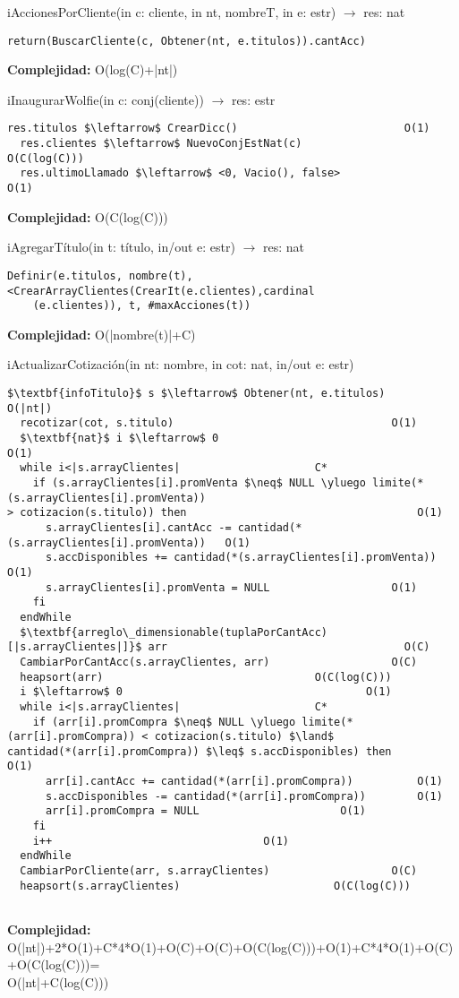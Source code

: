 iAccionesPorCliente(in c: cliente, in nt, nombreT, in e: estr) $\rightarrow$ res: nat
\begin{lstlisting}[mathescape]
  return(BuscarCliente(c, Obtener(nt, e.titulos)).cantAcc)
\end{lstlisting}
\textbf{Complejidad:} O(log(C)+|nt|)

iInaugurarWolfie(in c: conj(cliente)) $\rightarrow$ res: estr
\begin{lstlisting}[mathescape]
  res.titulos $\leftarrow$ CrearDicc()							O(1)
  res.clientes $\leftarrow$ NuevoConjEstNat(c)					O(C(log(C)))	
  res.ultimoLlamado $\leftarrow$ <0, Vacio(), false>					O(1)
\end{lstlisting}
\textbf{Complejidad:} O(C(log(C)))

iAgregarT\'itulo(in t: t\'itulo, in/out e: estr) $\rightarrow$ res: nat
\begin{lstlisting}[mathescape]
  Definir(e.titulos, nombre(t), <CrearArrayClientes(CrearIt(e.clientes),cardinal
  	(e.clientes)), t, #maxAcciones(t))
\end{lstlisting}
\textbf{Complejidad:} O(|nombre(t)|+C)

iActualizarCotizaci\'on(in nt: nombre, in cot: nat, in/out e: estr)
\begin{lstlisting}[mathescape]
  $\textbf{infoTitulo}$ s $\leftarrow$ Obtener(nt, e.titulos) 		O(|nt|)
  recotizar(cot, s.titulo)									O(1)
  $\textbf{nat}$ i $\leftarrow$ 0										O(1)
  while i<|s.arrayClientes|						C*
    if (s.arrayClientes[i].promVenta $\neq$ NULL \yluego limite(*(s.arrayClientes[i].promVenta))
> cotizacion(s.titulo)) then									O(1)
      s.arrayClientes[i].cantAcc -= cantidad(*(s.arrayClientes[i].promVenta))	O(1)
      s.accDisponibles += cantidad(*(s.arrayClientes[i].promVenta))		O(1)
      s.arrayClientes[i].promVenta = NULL					O(1)
    fi
  endWhile
  $\textbf{arreglo\_dimensionable(tuplaPorCantAcc)[|s.arrayClientes|]}$ arr										O(C)
  CambiarPorCantAcc(s.arrayClientes, arr)					O(C)
  heapsort(arr)								    O(C(log(C)))
  i $\leftarrow$ 0										O(1)
  while i<|s.arrayClientes|						C*
    if (arr[i].promCompra $\neq$ NULL \yluego limite(*(arr[i].promCompra)) < cotizacion(s.titulo) $\land$ 
cantidad(*(arr[i].promCompra)) $\leq$ s.accDisponibles) then			O(1)
      arr[i].cantAcc += cantidad(*(arr[i].promCompra))			O(1)
      s.accDisponibles -= cantidad(*(arr[i].promCompra))		O(1)
      arr[i].promCompra = NULL						O(1)
    fi
    i++									O(1)
  endWhile
  CambiarPorCliente(arr, s.arrayClientes)					O(C)
  heapsort(s.arrayClientes)						   O(C(log(C)))
  
\end{lstlisting}
\textbf{Complejidad:} O(|nt|)+2*O(1)+C*4*O(1)+O(C)+O(C)+O(C(log(C)))+O(1)+C*4*O(1)+O(C)+O(C(log(C)))=\\\indent\indent\indent O(|nt|+C(log(C)))


